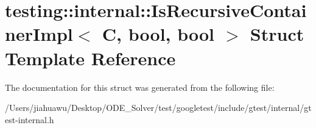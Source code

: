 \hypertarget{structtesting_1_1internal_1_1_is_recursive_container_impl}{}\section{testing\+:\+:internal\+:\+:Is\+Recursive\+Container\+Impl$<$ C, bool, bool $>$ Struct Template Reference}
\label{structtesting_1_1internal_1_1_is_recursive_container_impl}


The documentation for this struct was generated from the following file\+:\begin{DoxyCompactItemize}
\item 
/\+Users/jiahuawu/\+Desktop/\+O\+D\+E\+\_\+\+Solver/test/googletest/include/gtest/internal/gtest-\/internal.\+h\end{DoxyCompactItemize}
